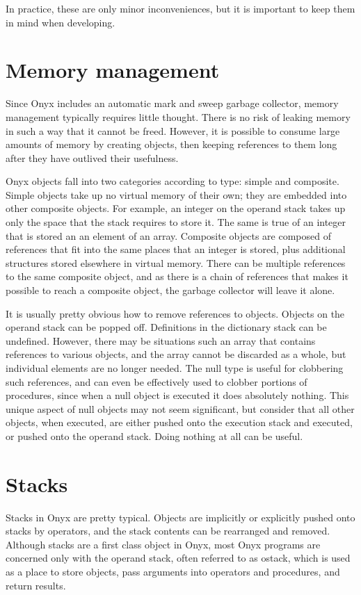 In practice, these are only minor inconveniences, but it is important to keep
them in mind when developing.

\section{Memory management}

Since Onyx includes an automatic mark and sweep garbage collector, memory
management typically requires little thought.  There is no risk of leaking
memory in such a way that it cannot be freed.  However, it is possible to
consume large amounts of memory by creating objects, then keeping references to
them long after they have outlived their usefulness.

Onyx objects fall into two categories according to type: simple and composite.
Simple objects take up no virtual memory of their own; they are embedded into
other composite objects.  For example, an integer on the operand stack takes up
only the space that the stack requires to store it.  The same is true of an
integer that is stored an an element of an array.  Composite objects are
composed of references that fit into the same places that an integer is stored,
plus additional structures stored elsewhere in virtual memory.  There can be
multiple references to the same composite object, and as there is a chain of
references that makes it possible to reach a composite object, the garbage
collector will leave it alone.

It is usually pretty obvious how to remove references to objects.  Objects on
the operand stack can be popped off.  Definitions in the dictionary stack can be
undefined.  However, there may be situations such an array that contains
references to various objects, and the array cannot be discarded as a whole, but
individual elements are no longer needed.  The null type is useful for
clobbering such references, and can even be effectively used to clobber portions
of procedures, since when a null object is executed it does absolutely nothing.
This unique aspect of null objects may not seem significant, but consider that
all other objects, when executed, are either pushed onto the execution stack and
executed, or pushed onto the operand stack.  Doing nothing at all can be useful.

\section{Stacks}

Stacks in Onyx are pretty typical.  Objects are implicitly or explicitly pushed
onto stacks by operators, and the stack contents can be rearranged and removed.
Although stacks are a first class object in Onyx, most Onyx programs are
concerned only with the operand stack, often referred to as ostack, which is
used as a place to store objects, pass arguments into operators and procedures,
and return results.

